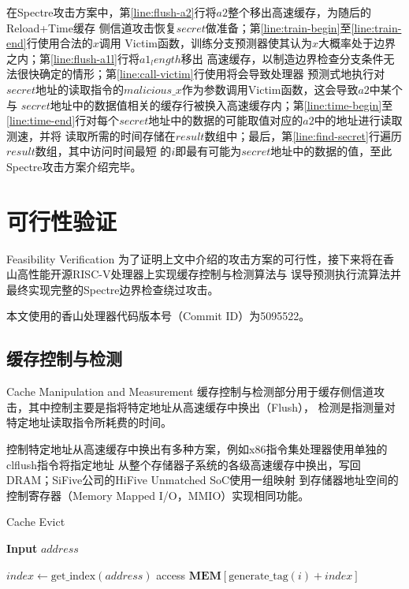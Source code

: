 在Spectre攻击方案中，第\ref{line:flush-a2}行将$a2$整个移出高速缓存，为随后的Reload+Time缓存
侧信道攻击恢复$secret$做准备；第\ref{line:train-begin}至\ref{line:train-end}行使用合法的$x$调用
Victim函数，训练分支预测器使其认为$x$大概率处于边界之内；第\ref{line:flush-a1l}行将$a1_length$移出
高速缓存，以制造边界检查分支条件无法很快确定的情形；第\ref{line:call-victim}行使用将会导致处理器
预测式地执行对$secret$地址的读取指令的$malicious\_x$作为参数调用Victim函数，这会导致$a2$中某个与
$secret$地址中的数据值相关的缓存行被换入高速缓存内；第\ref{line:time-begin}至
\ref{line:time-end}行对每个$secret$地址中的数据的可能取值对应的$a2$中的地址进行读取测速，并将
读取所需的时间存储在$result$数组中；最后，第\ref{line:find-secret}行遍历$result$数组，其中访问时间最短
的$i$即最有可能为$secret$地址中的数据的值，至此Spectre攻击方案介绍完毕。

\section{可行性验证}{Feasibility Verification} \label{sec:spectre-impl}
为了证明上文中介绍的攻击方案的可行性，接下来将在香山高性能开源RISC-V处理器上实现缓存控制与检测算法与
误导预测执行流算法并最终实现完整的Spectre边界检查绕过攻击。

本文使用的香山处理器代码版本号（Commit ID）为5095522。

\subsection{缓存控制与检测}{Cache Manipulation and Measurement}
缓存控制与检测部分用于缓存侧信道攻击，其中控制主要是指将特定地址从高速缓存中换出（Flush），
检测是指测量对特定地址读取指令所耗费的时间。

控制特定地址从高速缓存中换出有多种方案，例如x86指令集处理器使用单独的clflush指令将指定地址
从整个存储器子系统的各级高速缓存中换出，写回DRAM；SiFive公司的HiFive Unmatched SoC使用一组映射
到存储器地址空间的控制寄存器（Memory Mapped I/O，MMIO）实现相同功能。

\begin{algorithm}
	\caption{Cache Evict}\label{algo:cache-evict}
	\hspace*{\algorithmicindent} \textbf{Input} $address$
	\begin{algorithmic}[1]
			\State $index \gets \text{get\_index}(address)$
				\State access $\textbf{MEM}[\text{generate\_tag}(i) + index]$
		  	\EndFor
		\EndFunction
	\end{algorithmic}
\end{algorithm}

